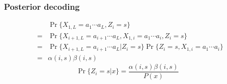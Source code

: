 \documentclass[10pt]{article}
\begin{document}
\subsubsection{Posterior decoding}
\begin{eqnarray*}
&& \Pr\{X_{1,L}=a_1\cdots a_L,Z_i=s\}\\
&=&\Pr\{X_{i+1,L}=a_{i+1}\cdots a_L,X_{1,i}=a_1\cdots a_i,Z_i=s\}\\
&=&\Pr\{X_{i+1,L}=a_{i+1}\cdots a_L|Z_i=s\}\Pr\{Z_i=s,X_{1,i}=a_1\cdots a_i\}\\
&=&\alpha(i,s)\beta(i,s)
\end{eqnarray*}
$$
\Pr\{Z_i=s|x\}=\frac{\alpha(i,s)\beta(i,s)}{P(x)}
$$
\end{document}
